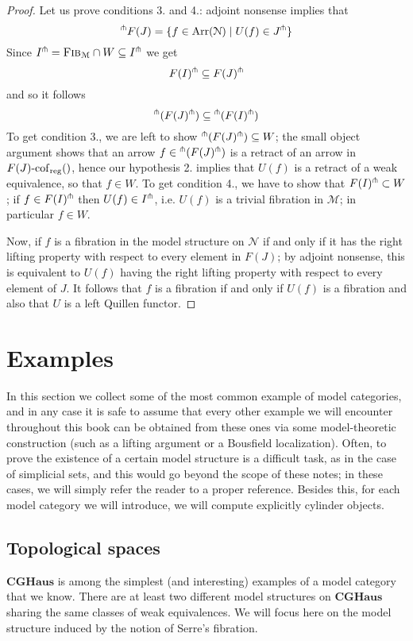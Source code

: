 \begin{refsection}
\begin{proof}
Let us prove conditions 3. and 4.: adjoint nonsense implies that
\[
{}^{\pitchfork}F(J) = \{f \in \mathrm{Arr}(\mathcal N) \mid U(f) \in J^{\pitchfork}\}
\]
Since $I^{\pitchfork} = \textsc{Fib}_{\mathcal M} \cap W \subseteq I^{\pitchfork}$ we get
\[
F(I)^{\pitchfork} \subseteq F(J)^{\pitchfork}
\]
and so it follows
\[
{}^{\pitchfork}(F(J)^{\pitchfork}) \subseteq {}^{\pitchfork}(F(I)^{\pitchfork})
\]
To get condition 3., we are left to show ${}^{\pitchfork}(F(J)^{\pitchfork}) \subseteq W$; the small object argument shows that an arrow $f \in {}^{\pitchfork}(F(J)^{\pitchfork})$ is a retract of an arrow in $F(J) \textrm{-} \cofreg$, hence our hypothesis 2. implies that $U(f)$ is a retract of a weak equivalence, so that $f \in W$. To get condition 4., we have to show that $F(I)^{\pitchfork} \subset W$; if $f \in F(I)^{\pitchfork}$ then $U(f) \in I^{\pitchfork}$, i.e. $U(f)$ is a trivial fibration in $\mathcal M$; in particular $f \in W$.

Now, if $f$ is a fibration in the model structure on $\mathcal N$ if and only if it has the right lifting property with respect to every element in $F(J)$; by adjoint nonsense, this is equivalent to $U(f)$ having the right lifting property with respect to every element of $J$. It follows that $f$ is a fibration if and only if $U(f)$ is a fibration and also that $U$ is a left Quillen functor.
\end{proof}

\section{Examples}

In this section we collect some of the most common example of model categories, and in any case it is safe to assume that every other example we will encounter throughout this book can be obtained from these ones via some model-theoretic construction (such as a lifting argument or a Bousfield localization). Often, to prove the existence of a certain model structure is a difficult task, as in the case of simplicial sets, and this would go beyond the scope of these notes; in these cases, we will simply refer the reader to a proper reference. Besides this, for each model category we will introduce, we will compute explicitly cylinder objects.

\subsection{Topological spaces}  \label{topological spaces}

$\mathbf{CGHaus}$ is among the simplest (and interesting) examples of a model category that we know. There are at least two different model structures on $\mathbf{CGHaus}$ sharing the same classes of weak equivalences. We will focus here on the model structure induced by the notion of Serre's fibration.


\end{refsection}
